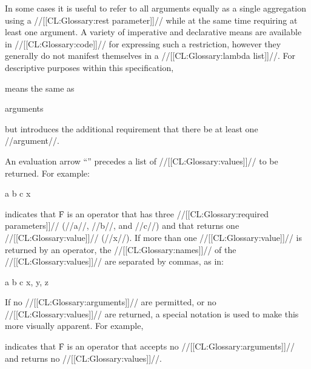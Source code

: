 \endsubsubsubsection%


In some cases it is useful to refer to all arguments equally as a single
aggregation using a //[[CL:Glossary:rest parameter]]// while at the same time
requiring at least one argument.  A variety of imperative and
declarative means are available in //[[CL:Glossary:code]]// for expressing such a
restriction, however they generally do not manifest themselves in a
//[[CL:Glossary:lambda list]]//.  For descriptive purposes within this specification,

 {{\rest} }

\noindent means the same as

 {{\rest} arguments}

\noindent but introduces the additional requirement that there be 
at least one //argument//.

\endsubsubsubsection%


An evaluation arrow ``{\EV}'' precedes a list of //[[CL:Glossary:values]]// to be returned.
For example:

 {a b c} {x}

\noindent indicates that \f{F} is an operator that has three //[[CL:Glossary:required parameters]]//
(\ie //a//, //b//, and //c//) and that returns one //[[CL:Glossary:value]]// (\ie //x//).
If more than one //[[CL:Glossary:value]]// is returned by an operator, the //[[CL:Glossary:names]]// of the
//[[CL:Glossary:values]]// are separated by commas, as in:

 {a b c} {x, y, z}


If no //[[CL:Glossary:arguments]]// are permitted, or no //[[CL:Glossary:values]]// are returned, 
a special notation is used to make this more visually apparent.  For example,

 {\noargs} {\novalues}

indicates that \f{F} is an operator that accepts no //[[CL:Glossary:arguments]]// and returns
no //[[CL:Glossary:values]]//.

\endsubsubsubsubsection%

